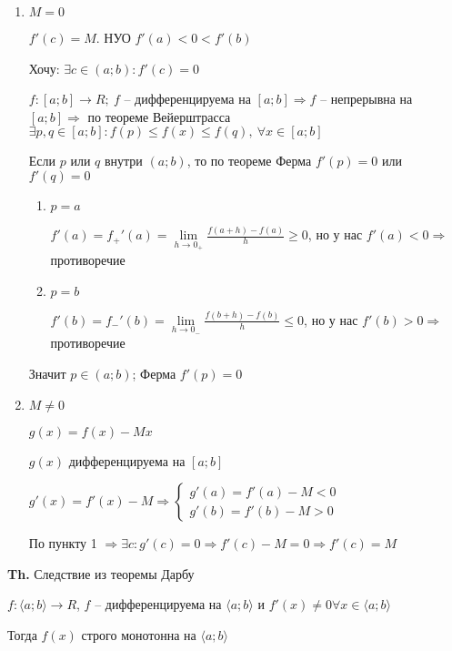 \documentclass[14pt, letter paper]{article}
\newcommand{\q}[1]{\langle #1 \rangle}
\begin{document}
\begin{enumerate}
    \item $M = 0$
    
    $f'(c) = M$. НУО $f'(a) < 0 < f'(b)$

    Хочу: $\exists c \in (a; b) : f'(c) = 0$

    $f : [a; b] \rightarrow R;\ f$ -- дифференцируема на $[a; b] \Rightarrow f$ -- непрерывна на $[a; b] \Rightarrow$ по теореме Вейерштрасса $\exists p, q \in [a; b] : f(p) \leq f(x) \leq f(q),\ \forall x \in [a; b]$

    Если $p$ или $q$ внутри $(a; b)$, то по теореме Ферма $f'(p) = 0$ или $f'(q) = 0$

    \begin{enumerate}
        \item $p = a$
        
        $f'(a) = f_+'(a) = \lim\limits_{h \rightarrow 0_+} \frac{f(a + h) - f(a)}{h} \geq 0$, но у нас $f'(a) < 0 \Rightarrow$ противоречие

        \item $p = b$
        
        $f'(b) = f_-'(b) = \lim\limits_{h \rightarrow 0_-} \frac{f(b + h) - f(b)}{h} \leq 0$, но у нас $f'(b) > 0 \Rightarrow$ противоречие
    \end{enumerate}

    Значит $p \in (a; b)$; Ферма $f'(p) = 0$

    \item $M \neq 0$
    
    $g(x) = f(x) - Mx$

    $g(x)$ дифференцируема на $[a; b]$

    $g'(x) = f'(x) - M \Rightarrow \begin{cases}
        g'(a) = f'(a) - M < 0\\
        g'(b) = f'(b) - M > 0
    \end{cases}$

    По пункту 1 $\Rightarrow \exists c : g'(c) = 0 \Rightarrow f'(c) - M = 0 \Rightarrow f'(c) = M$
\end{enumerate}

\vspace{5mm}

\textbf{Th.} Следствие из теоремы Дарбу

$f : \q{a; b} \rightarrow R$, $f$ -- дифференцируема на $\q{a; b}$ и $f'(x) \neq 0 \forall x \in \q{a; b}$

Тогда $f(x)$ строго монотонна на $\q{a; b}$
\end{document}
